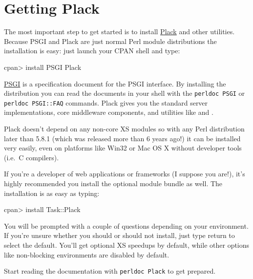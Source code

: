 \chapter{Getting Plack}\label{day-1-getting-plack}

The most important step to get started is to install
\href{http://search.cpan.org/dist/Plack}{Plack} and other utilities.
Because PSGI and Plack are just normal Perl module distributions the
installation is easy: just launch your CPAN shell and type:

\begin{shell}
cpan> install PSGI Plack
\end{shell}

\href{http://search.cpan.org/dist/PSGI}{PSGI} is a specification
document for the PSGI interface. By installing the distribution you can
read the documents in your shell with the \lstinline!perldoc PSGI! or
\lstinline!perldoc PSGI::FAQ! commands. Plack gives you the standard
server implementations, core middleware components, and utilities like
 and .

Plack doesn't depend on any non-core XS modules so with any Perl
distribution later than 5.8.1 (which was released more than 6 years
ago!) it can be installed very easily, even on platforms like Win32 or
Mac OS X without developer tools (i.e.~C compilers).

If you're a developer of web applications or frameworks (I suppose you
are!), it's highly recommended you install the optional module bundle
\href{http://search.cpan.org/dist/Task-Plack}{} as well. The
installation is as easy as typing:

\begin{shell}
cpan> install Task::Plack
\end{shell}

You will be prompted with a couple of questions depending on your
environment. If you're unsure whether you should or should not install,
just type return to select the default. You'll get optional XS speedups
by default, while other options like non-blocking environments are
disabled by default.

Start reading the documentation with \lstinline!perldoc Plack! to get
prepared.


